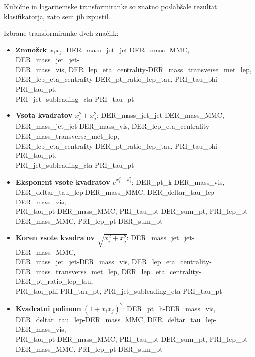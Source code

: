 \documentclass[11pt,a4paper,openany]{book}
\begin{document}
\noindent Kubične in logaritemske transformiranke so znatno poslabšale rezultat klasifikatorja, zato sem jih izpustil.

\noindent Izbrane transformiranke dveh značilk:
\begin{itemize}
	\item \textbf{Zmnožek $x_ix_j$}: DER\_mass\_jet\_jet-DER\_mass\_MMC, DER\_mass\_jet\_jet- \\ DER\_mass\_vis, DER\_lep\_eta\_centrality-DER\_mass\_transverse\_met\_lep, \\ DER\_lep\_eta\_centrality-DER\_pt\_ratio\_lep\_tau, PRI\_tau\_phi-PRI\_tau\_pt, \\ PRI\_jet\_subleading\_eta-PRI\_tau\_pt
	
	\item \textbf{Vsota kvadratov $x_i^2 + x_j^2$}: DER\_mass\_jet\_jet-DER\_mass\_MMC, DER\_mass\_jet\_jet-DER\_mass\_vis, DER\_lep\_eta\_centrality-DER\_mass\_transverse\_met\_lep, \\
	DER\_lep\_eta\_centrality-DER\_pt\_ratio\_lep\_tau, PRI\_tau\_phi-PRI\_tau\_pt, \\ PRI\_jet\_subleading\_eta-PRI\_tau\_pt
	
	\item \textbf{Eksponent vsote kvadratov $e^{x_i^2 + x_j^2}$}: DER\_pt\_h-DER\_mass\_vis, \\ DER\_deltar\_tau\_lep-DER\_mass\_MMC, DER\_deltar\_tau\_lep-DER\_mass\_vis, \\ PRI\_tau\_pt-DER\_mass\_MMC, PRI\_tau\_pt-DER\_sum\_pt, PRI\_lep\_pt- \\ DER\_mass\_MMC, PRI\_lep\_pt-DER\_sum\_pt
	
	\item \textbf{Koren vsote kvadratov $\sqrt{x_i^2 + x_j^2}$}:  DER\_mass\_jet\_jet-DER\_mass\_MMC, \\ DER\_mass\_jet\_jet-DER\_mass\_vis, DER\_lep\_eta\_centrality- \\ DER\_mass\_transverse\_met\_lep,
	DER\_lep\_eta\_centrality-DER\_pt\_ratio\_lep\_tau, \\ PRI\_tau\_phi-PRI\_tau\_pt, PRI\_jet\_subleading\_eta-PRI\_tau\_pt
	
	\item \textbf{Kvadratni polinom $(1 + x_ix_j)^2$}: DER\_pt\_h-DER\_mass\_vis, \\
	DER\_deltar\_tau\_lep-DER\_mass\_MMC, DER\_deltar\_tau\_lep-DER\_mass\_vis,  \\ PRI\_tau\_pt-DER\_mass\_MMC,
	PRI\_tau\_pt-DER\_sum\_pt, PRI\_lep\_pt- \\ DER\_mass\_MMC, PRI\_lep\_pt-DER\_sum\_pt
	
\end{itemize}
\end{document}
